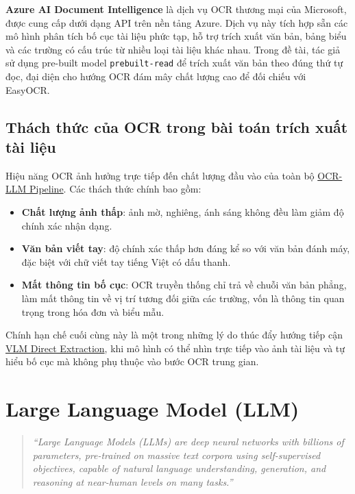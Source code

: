 ﻿\documentclass[12pt]{report}
\begin{document}
\textbf{Azure AI Document Intelligence}\footnotemark{} là dịch vụ OCR thương mại của Microsoft, được cung cấp dưới dạng API trên nền tảng Azure. Dịch vụ này tích hợp sẵn các mô hình phân tích bố cục tài liệu phức tạp, hỗ trợ trích xuất văn bản, bảng biểu và các trường có cấu trúc từ nhiều loại tài liệu khác nhau. Trong đề tài, tác giả sử dụng pre-built model \texttt{prebuilt-read} để trích xuất văn bản theo đúng thứ tự đọc, đại diện cho hướng OCR đám mây chất lượng cao để đối chiếu với EasyOCR.

\subsection{Thách thức của OCR trong bài toán trích xuất tài liệu}\label{sec:ocr_challenges}

Hiệu năng OCR ảnh hưởng trực tiếp đến chất lượng đầu vào của toàn bộ \hyperref[sec:ocr_llm_pipeline]{OCR-LLM Pipeline}. Các thách thức chính bao gồm:

\begin{itemize}
    \item \textbf{Chất lượng ảnh thấp}: ảnh mờ, nghiêng, ánh sáng không đều làm giảm độ chính xác nhận dạng.
    \item \textbf{Văn bản viết tay}: độ chính xác thấp hơn đáng kể so với văn bản đánh máy, đặc biệt với chữ viết tay tiếng Việt có dấu thanh.
    \item \textbf{Mất thông tin bố cục}: OCR truyền thống chỉ trả về chuỗi văn bản phẳng, làm mất thông tin về vị trí tương đối giữa các trường, vốn là thông tin quan trọng trong hóa đơn và biểu mẫu.
\end{itemize}

Chính hạn chế cuối cùng này là một trong những lý do thúc đẩy hướng tiếp cận \hyperref[sec:vlm_pipeline]{VLM Direct Extraction}, khi mô hình có thể nhìn trực tiếp vào ảnh tài liệu và tự hiểu bố cục mà không phụ thuộc vào bước OCR trung gian.

\section{Large Language Model (LLM)}\label{sec:llm}

\begin{quote}
\emph{``Large Language Models (LLMs) are deep neural networks with billions of parameters, pre-trained on massive text corpora using self-supervised objectives, capable of natural language understanding, generation, and reasoning at near-human levels on many tasks.''} \cite{openai2023gpt4}
\end{quote}
\end{document}
